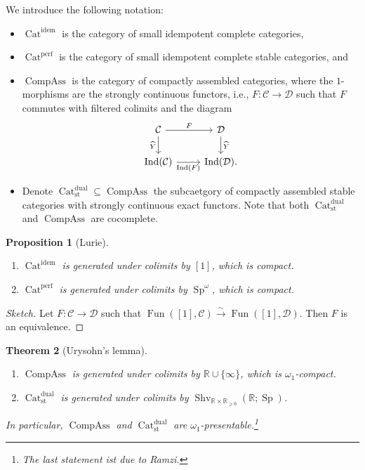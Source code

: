 \documentclass[draft]{amsart}
\newcommand{\RR}{\mathbb{R}}
\newcommand{\wh}[1]{\widehat{#1}}
\newcommand{\cat}[1]{\mathcal{#1}}
\newcommand{\isoto}{\mathbin{\xrightarrow{\sim}}}
\DeclareMathOperator{\Ind}{Ind}
\DeclareMathOperator{\Shv}{Shv}
\DeclareMathOperator{\Cat}{Cat}
\DeclareMathOperator{\CompAss}{CompAss}
\DeclareMathOperator{\Sp}{Sp}
\DeclareMathOperator{\Fun}{Fun}
\newtheorem{thm}{Theorem}[section]
\newtheorem{prop}[thm]{Proposition}
\theoremstyle{definition}
\begin{document}
We introduce the following notation:
\begin{itemize}
\item $\Cat^{\mathrm{idem}}$ is the category of small idempotent complete categories,

\item $\Cat^{\mathrm{perf}}$ is the category of small idempotent complete stable categories, and 

\item $\CompAss$ is the category of compactly assembled categories, where the $1$-morphisms are the strongly continuous functors, i.e., $F\colon \cat C\to \cat D$ such that $F$ commutes with filtered colimits and the diagram
\[
\begin{tikzcd}
\cat C \ar[d,"\wh{Y}"'] \ar[r,"F"] & \cat D \ar[d,"\wh{Y}"] \\
\Ind(\cat C)\ar[r,"\Ind(F)"'] & \Ind(\cat D).
\end{tikzcd}
\]

\item Denote $\Cat^{\mathrm{dual}}_{\mathrm{st}} \subseteq \CompAss$ the subcaetgory of compactly assembled stable categories with strongly continuous exact functors.
Note that both $\Cat^{\mathrm{dual}}_{\mathrm{st}}$ and $\CompAss$ are cocomplete.
\end{itemize}

\begin{prop}[Lurie]
\begin{enumerate}[(1)]
\item $\Cat^{\mathrm{idem}}$ is generated under colimits by $[1]$, which is compact.

\item $\Cat^{\mathrm{perf}}$ is generated under colimits by $\Sp^{\omega}$, which is compact.
\end{enumerate}
\end{prop}
\begin{proof}[Sketch]
Let $F\colon \cat C\to \cat D$ such that $\Fun([1],\cat C) \isoto \Fun([1], \cat D)$. Then $F$ is an equivalence.
\end{proof}

\begin{thm}[Urysohn's lemma]\label{Efimov:Urysohn}
\begin{enumerate}[(1)]
\item $\CompAss$ is generated under colimits by $\RR\cup \{\infty\}$, which is $\omega_1$-compact.

\item $\Cat^{\mathrm{dual}}_{\mathrm{st}}$ is generated under colimits by $\Shv_{\RR\times \RR_{\ge0}}(\RR;\Sp)$.
\end{enumerate}
In particular, $\CompAss$ and $\Cat^{\mathrm{dual}}_{\mathrm{st}}$ are $\omega_1$-presentable.\footnote{The last statement ist due to Ramzi.}
\end{thm}
\end{document}
